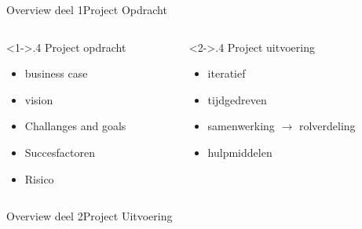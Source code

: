 \begin{frame}[label=opdracht]{Overview deel 1}{Project Opdracht}

    \begin{columns}
        \begin{column}<1->{.4\textwidth}
	    Project opdracht

	    \begin{itemize}
		\item business case
		\item vision
		\item Challanges and goals
		\item Succesfactoren
		\item Risico
	    \end{itemize}
        \end{column}
        \begin{column}<2->{.4\textwidth}
	    Project uitvoering

	    \begin{itemize}
		\item iteratief
		\item tijdgedreven
		\item samenwerking $\rightarrow$ rolverdeling
		\item hulpmiddelen
	    \end{itemize}
        \end{column}


    \end{columns}



\end{frame}

\begin{frame}[label=kenmerken]{Overview deel 2}{Project Uitvoering}


\end{frame}

